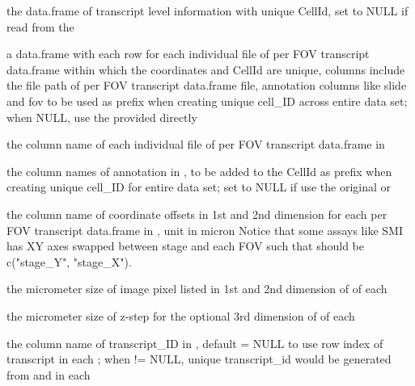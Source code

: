 \documentclass[letterpaper]{book}
\begin{document}
\begin{Arguments}
\begin{ldescription}
\item[\code{transcript\_df}] the data.frame of transcript level information with unique CellId, set to NULL if read from the 

\item[\code{transDF\_fileInfo}] a data.frame with each row for each individual file of per FOV transcript data.frame within which the coordinates and CellId are unique, columns include the file path of per FOV transcript data.frame file, annotation columns like slide and fov to be used as prefix when creating unique cell\_ID across entire data set; when NULL, use the provided  directly

\item[\code{filepath\_coln}] the column name of each individual file of per FOV transcript data.frame in 

\item[\code{prefix\_colns}] the column names of annotation in , to be added to the CellId as prefix when creating unique cell\_ID for entire data set; set to NULL if use the original  or 

\item[\code{fovOffset\_colns}] the column name of coordinate offsets in 1st and 2nd dimension for each per FOV transcript data.frame in , unit in micron
Notice that some assays like SMI has XY axes swapped between stage and each FOV such that  should be c("stage\_Y", "stage\_X").

\item[\code{pixel\_size}] the micrometer size of image pixel listed in 1st and 2nd dimension of  of each 

\item[\code{zstep\_size}] the micrometer size of z-step for the optional 3rd dimension of  of each 

\item[\code{transID\_coln}] the column name of transcript\_ID in , default = NULL to use row index of transcript in each ; when  != NULL, unique transcript\_id would be generated from  and  in each 


\end{ldescription}
\end{Arguments}
\end{document}
